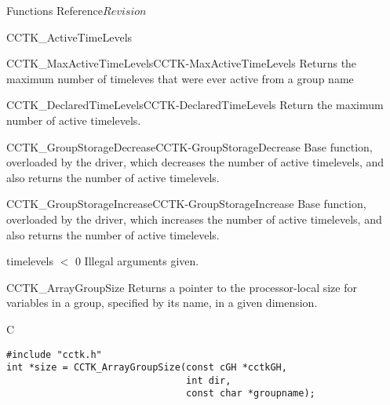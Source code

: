 \begin{cactuspart}{ Functions Reference}{}{$Revision$}
\begin{FunctionDescription}{CCTK\_ActiveTimeLevels}
\begin{SeeAlsoSection}
\begin{SeeAlso2}{CCTK\_MaxActiveTimeLevels}{CCTK-MaxActiveTimeLevels}
  Returns the maximum number of timeleves that were ever active from a group name
\end{SeeAlso2}
\begin{SeeAlso2}{CCTK\_DeclaredTimeLevels}{CCTK-DeclaredTimeLevels}
Return the maximum number of active timelevels.
\end{SeeAlso2}
\begin{SeeAlso2}{CCTK\_GroupStorageDecrease}{CCTK-GroupStorageDecrease}
Base function, overloaded by the driver, which decreases the number of
active timelevels, and also returns the number of active timelevels.
\end{SeeAlso2}
\begin{SeeAlso2}{CCTK\_GroupStorageIncrease}{CCTK-GroupStorageIncrease}
Base function, overloaded by the driver, which increases the number of
active timelevels, and also returns the number of active timelevels.
\end{SeeAlso2}
\end{SeeAlsoSection}

\begin{ErrorSection}
\begin{Error}{timelevels $<$ 0}
Illegal arguments given.
\end{Error}
\end{ErrorSection}

\end{FunctionDescription}



\begin{FunctionDescription}{CCTK\_ArrayGroupSize}{}
\label{CCTK-ArrayGroupSize}
Returns a pointer to the processor-local size for variables in a
group, specified by its name, in a given dimension.
\begin{SynopsisSection}
\begin{Synopsis}{C}
\begin{verbatim}
#include "cctk.h"
int *size = CCTK_ArrayGroupSize(const cGH *cctkGH,
                                int dir,
                                const char *groupname);
\end{verbatim}
\end{Synopsis}
\end{SynopsisSection}


\end{FunctionDescription}
\end{cactuspart}
